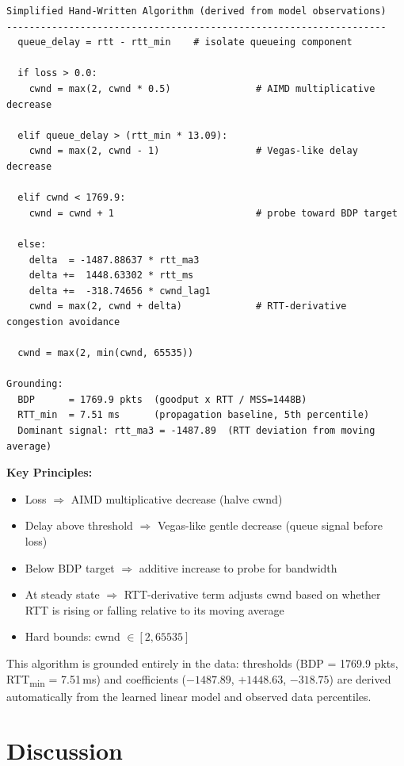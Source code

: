 \documentclass[11pt]{article}
\begin{document}
\begin{lstlisting}
Simplified Hand-Written Algorithm (derived from model observations)
-------------------------------------------------------------------
  queue_delay = rtt - rtt_min    # isolate queueing component

  if loss > 0.0:
    cwnd = max(2, cwnd * 0.5)               # AIMD multiplicative decrease

  elif queue_delay > (rtt_min * 13.09):
    cwnd = max(2, cwnd - 1)                 # Vegas-like delay decrease

  elif cwnd < 1769.9:
    cwnd = cwnd + 1                         # probe toward BDP target

  else:
    delta  = -1487.88637 * rtt_ma3
    delta +=  1448.63302 * rtt_ms
    delta +=  -318.74656 * cwnd_lag1
    cwnd = max(2, cwnd + delta)             # RTT-derivative congestion avoidance

  cwnd = max(2, min(cwnd, 65535))

Grounding:
  BDP      = 1769.9 pkts  (goodput x RTT / MSS=1448B)
  RTT_min  = 7.51 ms      (propagation baseline, 5th percentile)
  Dominant signal: rtt_ma3 = -1487.89  (RTT deviation from moving average)
\end{lstlisting}

\textbf{Key Principles:}
\begin{itemize}
    \item Loss $\Rightarrow$ AIMD multiplicative decrease (halve cwnd)
    \item Delay above threshold $\Rightarrow$ Vegas-like gentle decrease (queue signal before loss)
    \item Below BDP target $\Rightarrow$ additive increase to probe for bandwidth
    \item At steady state $\Rightarrow$ RTT-derivative term adjusts cwnd based on whether RTT is rising or falling relative to its moving average
    \item Hard bounds: cwnd $\in [2, 65535]$
\end{itemize}

This algorithm is grounded entirely in the data: thresholds (BDP = 1769.9 pkts, RTT\textsubscript{min} = 7.51\,ms) and coefficients ($-1487.89$, $+1448.63$, $-318.75$) are derived automatically from the learned linear model and observed data percentiles.

\section{Discussion}
\end{document}
